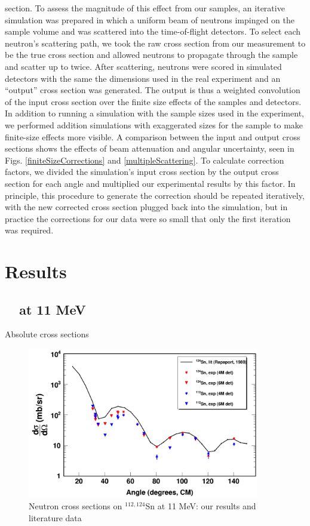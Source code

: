 section. To assess the magnitude of this effect from our
samples, an iterative simulation was prepared in which a uniform beam of neutrons
impinged on the sample volume and was scattered into the time-of-flight
detectors. To select each neutron's scattering path, we took the
raw cross section from our measurement to be the true cross section and allowed
neutrons to propagate through the sample and scatter up to twice. After
scattering, neutrons were scored in simulated detectors with the same the dimensions
used in the real experiment and an ``output'' cross section was generated. The
output is thus a weighted convolution of the input cross section
over the finite size effects of the samples and detectors. In addition to
running a simulation with the sample sizes used in the experiment, we performed
addition simulations with exaggerated sizes for the
sample to make finite-size effects more visible. A comparison between the input
and output cross sections shows the effects of beam attenuation and angular
uncertainty, seen in Figs. \ref{finiteSizeCorrections} and
\ref{multipleScattering}.
To calculate correction factors, we divided the simulation's
input cross section by the output cross section for each angle and multiplied our
experimental results by this factor. In principle, this procedure to generate
the correction should be repeated iteratively, with the new corrected cross
section plugged back into the simulation, but in practice the corrections for
our data were so small that only the first iteration was required.
\section{Results}
\subsection{\snTwelveFour\ \el\ at 11 MeV}
Absolute cross sections 
\begin{figure}[ht!]
    \centering
        \includegraphics[width = 0.9\textwidth]{figures/neutronECS_Sn_11MeV.png}
        \caption{Neutron \el cross sections on $^{112,124}$Sn at 11
    MeV: our results and literature data}
    \label{SnECS_11MeV}
\end{figure}
